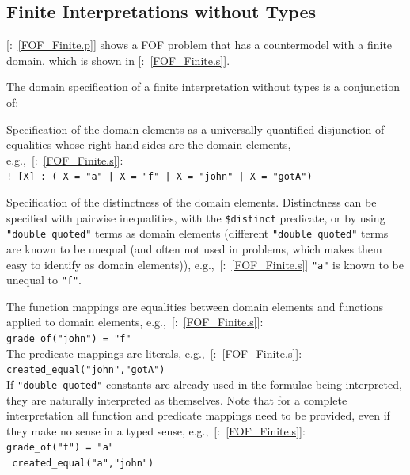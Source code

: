 \documentclass{easychair}
\newcommand{\smalltt}[1]{\small \texttt{#1}}
\newcommand{\example}{{\scriptsize \faFile[regular]}}
\newcommand{\tildenot}{\raisebox{0.4ex}{\texttildelow}}
\newenvironment{packed_itemize}{
\vspace*{-0.3em}
\begin{itemize}
\setlength{\partopsep}{0pt}
\setlength{\itemsep}{1pt}
\setlength{\parskip}{0pt}
\setlength{\parsep}{0pt}
}{\end{itemize}}
\begin{document}
\subsection{Finite Interpretations without Types}
\label{FOFTarskian}

[\example{}:~\ref{FOF_Finite.p}] shows a FOF problem that has a countermodel with a finite 
domain, which is shown in [\example{}:~\ref{FOF_Finite.s}].

The domain specification of a finite interpretation without types is a conjunction of:
\begin{packed_itemize}
\item Specification of the domain elements as a universally quantified disjunction of equalities 
      whose right-hand sides are the domain elements, 
      e.g.,~[\example{}:~\ref{FOF_Finite.s}]:\\
      \hspace*{0.5cm}\smalltt{! [X] : ( X = "a" | X = "f" | X = "john" | X = "gotA")}
\item Specification of the distinctness of the domain elements.
      Distinctness can be specified with pairwise inequalities, with the \smalltt{\$distinct} 
      predicate, or by using \smalltt{"double quoted"} terms as domain elements (different 
      \smalltt{"double quoted"} terms are known to be unequal (and often not used in problems,
      which makes them easy to identify as domain elements)),
      e.g.,~[\example{}:~\ref{FOF_Finite.s}] \smalltt{"a"} is known to be unequal to \smalltt{"f"}.
\end{packed_itemize}

The function mappings are equalities between domain elements and functions applied to domain 
elements,
e.g.,~[\example{}:~\ref{FOF_Finite.s}]: \\
\hspace*{0.5cm}\smalltt{grade\_of("john") = "f"}\\
The predicate mappings are literals, e.g.,~[\example{}:~\ref{FOF_Finite.s}]: \\
\hspace*{0.5cm}\smalltt{created\_equal("john","gotA")}\\
If \smalltt{"double quoted"} constants are already used in the formulae being interpreted, they
are naturally interpreted as themselves.
Note that for a complete interpretation all function and predicate mappings need to be provided,
even if they make no sense in a typed sense, e.g.,~[\example{}:~\ref{FOF_Finite.s}]: \\
\hspace*{0.5cm}\smalltt{grade\_of("f") = "a"}\\
\hspace*{0.5cm}\smalltt{\tildenot{}\,created\_equal("a","john")}
\end{document}
